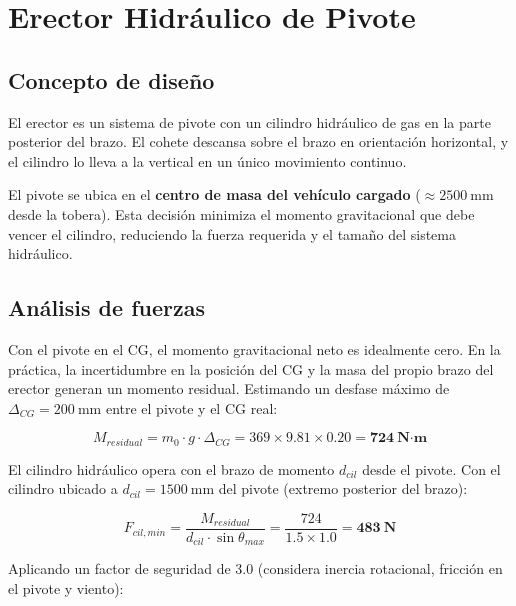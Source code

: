 \documentclass[11pt, a4paper]{article}
\begin{document}
\section{Erector Hidr\'{a}ulico de Pivote}

\subsection{Concepto de dise\~{n}o}

El erector es un sistema de pivote con un cilindro hidr\'{a}ulico de gas en la parte posterior del brazo. El cohete descansa sobre el brazo en orientaci\'{o}n horizontal, y el cilindro lo lleva a la vertical en un \'{u}nico movimiento continuo.

El pivote se ubica en el \textbf{centro de masa del veh\'{i}culo cargado} ($\approx 2500\ \text{mm}$ desde la tobera). Esta decisi\'{o}n minimiza el momento gravitacional que debe vencer el cilindro, reduciendo la fuerza requerida y el tama\~{n}o del sistema hidr\'{a}ulico.

\subsection{An\'{a}lisis de fuerzas}

Con el pivote en el CG, el momento gravitacional neto es idealmente cero. En la pr\'{a}ctica, la incertidumbre en la posici\'{o}n del CG y la masa del propio brazo del erector generan un momento residual. Estimando un desfase m\'{a}ximo de $\Delta_{CG} = 200\ \text{mm}$ entre el pivote y el CG real:

\begin{equation}
  M_{residual} = m_0 \cdot g \cdot \Delta_{CG}
  = 369 \times 9.81 \times 0.20 = \mathbf{724\ \text{N·m}}
\end{equation}

El cilindro hidr\'{a}ulico opera con el brazo de momento $d_{cil}$ desde el pivote. Con el cilindro ubicado a $d_{cil} = 1500\ \text{mm}$ del pivote (extremo posterior del brazo):

\begin{equation}
  F_{cil,min} = \frac{M_{residual}}{d_{cil} \cdot \sin\theta_{max}}
  = \frac{724}{1.5 \times 1.0} = \mathbf{483\ \text{N}}
\end{equation}

Aplicando un factor de seguridad de 3.0 (considera inercia rotacional, fricci\'{o}n en el pivote y viento):
\end{document}
